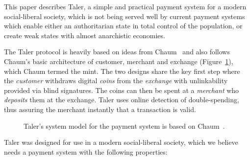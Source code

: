 \documentclass{llncs}
\begin{document}
This paper describes Taler, a simple and practical payment system for
a modern social-liberal society, which is not being served well by
current payment systems which enable either an authoritarian state in
total control of the population, or create weak states with almost
anarchistic economies.

The Taler protocol is heavily based on ideas from
Chaum~\cite{chaum1983blind} and also follows Chaum's basic architecture of
customer, merchant and exchange (Figure~\ref{fig:cmm}),
 which Chaum termed the mint.
The two designs share the key first step where the {\em customer}
withdraws digital {\em coins} from the {\em exchange} with unlinkability
provided via blind signatures.  The coins can then be spent at a
{\em merchant} who {\em deposits} them at the exchange.  
Taler uses online detection of double-spending, thus assuring the merchant
instantly that a transaction is valid.

\begin{figure}[h]
\centering
{}
\caption{Taler's system model for the payment system is based on Chaum~\cite{chaum1983blind}.}
\label{fig:cmm}
\end{figure}

Taler was designed for use in a modern social-liberal society, which we
believe needs a payment system with the following properties:
\end{document}
